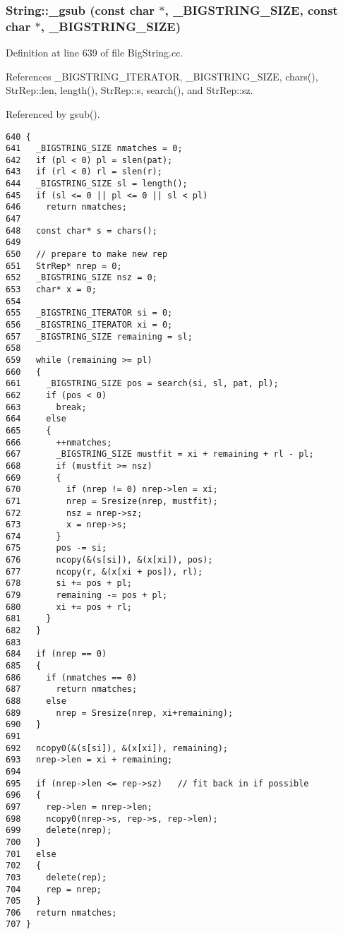 \subsubsection{ String::\_\-gsub (const char $\ast$, {\bf \_\-BIGSTRING\_\-SIZE}, const char $\ast$, {\bf \_\-BIGSTRING\_\-SIZE})\hspace{0.3cm}{\tt  [protected]}}\label{classString_b3}




Definition at line 639 of file Big\-String.cc.

References \_\-BIGSTRING\_\-ITERATOR, \_\-BIGSTRING\_\-SIZE, chars(), Str\-Rep::len, length(), Str\-Rep::s, search(), and Str\-Rep::sz.

Referenced by gsub().



\footnotesize\begin{verbatim}640 {
641   _BIGSTRING_SIZE nmatches = 0;
642   if (pl < 0) pl = slen(pat);
643   if (rl < 0) rl = slen(r);
644   _BIGSTRING_SIZE sl = length();
645   if (sl <= 0 || pl <= 0 || sl < pl)
646     return nmatches;
647   
648   const char* s = chars();
649 
650   // prepare to make new rep
651   StrRep* nrep = 0;
652   _BIGSTRING_SIZE nsz = 0;
653   char* x = 0;
654 
655   _BIGSTRING_ITERATOR si = 0;
656   _BIGSTRING_ITERATOR xi = 0;
657   _BIGSTRING_SIZE remaining = sl;
658 
659   while (remaining >= pl)
660   {
661     _BIGSTRING_SIZE pos = search(si, sl, pat, pl);
662     if (pos < 0)
663       break;
664     else
665     {
666       ++nmatches;
667       _BIGSTRING_SIZE mustfit = xi + remaining + rl - pl;
668       if (mustfit >= nsz)
669       {
670         if (nrep != 0) nrep->len = xi;
671         nrep = Sresize(nrep, mustfit);
672         nsz = nrep->sz;
673         x = nrep->s;
674       }
675       pos -= si;
676       ncopy(&(s[si]), &(x[xi]), pos);
677       ncopy(r, &(x[xi + pos]), rl);
678       si += pos + pl;
679       remaining -= pos + pl;
680       xi += pos + rl;
681     }
682   }
683 
684   if (nrep == 0)
685   {
686     if (nmatches == 0)
687       return nmatches;
688     else
689       nrep = Sresize(nrep, xi+remaining);
690   }
691 
692   ncopy0(&(s[si]), &(x[xi]), remaining);
693   nrep->len = xi + remaining;
694 
695   if (nrep->len <= rep->sz)   // fit back in if possible
696   {
697     rep->len = nrep->len;
698     ncopy0(nrep->s, rep->s, rep->len);
699     delete(nrep);
700   }
701   else
702   {
703     delete(rep);
704     rep = nrep;
705   }
706   return nmatches;
707 }
\end{verbatim}\normalsize 
{}
